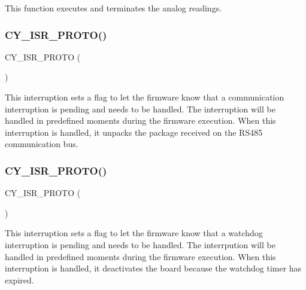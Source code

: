 This function executes and terminates the analog readings. \mbox{\label{interruptions_8h_a7e24af8c83537b0441877bf0f00dd30a}} 
\subsubsection{C\+Y\+\_\+\+I\+S\+R\+\_\+\+P\+R\+O\+T\+O()\hspace{0.1cm}{\footnotesize\ttfamily [1/3]}}
{\footnotesize\ttfamily C\+Y\+\_\+\+I\+S\+R\+\_\+\+P\+R\+O\+TO (\begin{DoxyParamCaption}\item[{I\+S\+R\+\_\+\+R\+S485\+\_\+\+R\+X\+\_\+\+Ex\+Interrupt}]{ }\end{DoxyParamCaption})}

This interruption sets a flag to let the firmware know that a communication interruption is pending and needs to be handled. The interruption will be handled in predefined moments during the firmware execution. When this interruption is handled, it unpacks the package received on the R\+S485 communication bus. \mbox{\label{interruptions_8h_a212cae8995d67d612c236fb54a4d29dc}} 
\subsubsection{C\+Y\+\_\+\+I\+S\+R\+\_\+\+P\+R\+O\+T\+O()\hspace{0.1cm}{\footnotesize\ttfamily [2/3]}}
{\footnotesize\ttfamily C\+Y\+\_\+\+I\+S\+R\+\_\+\+P\+R\+O\+TO (\begin{DoxyParamCaption}\item[{I\+S\+R\+\_\+\+W\+A\+T\+C\+H\+D\+O\+G\+\_\+\+Handler}]{ }\end{DoxyParamCaption})}

This interruption sets a flag to let the firmware know that a watchdog interruption is pending and needs to be handled. The interrpution will be handled in predefined moments during the firmware execution. When this interruption is handled, it deactivates the board because the watchdog timer has expired. \mbox{\label{interruptions_8h_a4b74d7d608d07d4a230aaa9cd0c1a21a}} 
